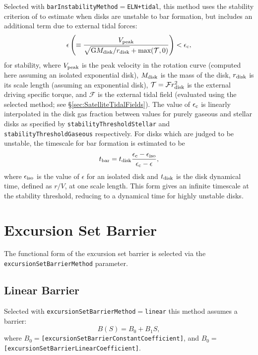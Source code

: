 Selected with {\tt barInstabilityMethod}$=${\tt ELN+tidal}, this method uses the stability criterion of \cite{efstathiou_stability_1982} to estimate when disks are unstable to bar formation, but includes an additional term due to external tidal forces:
\begin{equation}
 \epsilon \left( \equiv {V_{\rm peak} \over \sqrt{\G M_{\rm disk}/r_{\rm disk}} + \hbox{max}(\mathcal{T},0) } \right) < \epsilon_{\rm c},
\end{equation}
for stability, where $V_{\rm peak}$ is the peak velocity in the rotation curve (computed here assuming an isolated exponential disk), $M_{\rm disk}$ is the mass of the disk, $r_{\rm disk}$ is its scale length (assuming an exponential disk), $\mathcal{T} = \mathcal{F} r_{\rm disk}^2$ is the external driving specific torque, and $\mathcal{F}$ is the external tidal field (evaluated using the selected method; see \S\ref{sec:SatelliteTidalFields}). The value of $\epsilon_{\rm c}$ is linearly interpolated in the disk gas fraction between values for purely gaseous and stellar disks as specified by {\tt stabilityThresholdStellar} and {\tt stabilityThresholdGaseous} respectively. For disks which are judged to be unstable, the timescale for bar formation is estimated to be
\begin{equation}
 t_{\rm bar} = t_{\rm disk} {\epsilon_{\rm c} - \epsilon_{\rm iso} \over \epsilon_{\rm c} - \epsilon},
\end{equation}
where $\epsilon_{\rm iso}$ is the value of $\epsilon$ for an isolated disk and $t_{\rm disk}$ is the disk dynamical time, defined as $r/V$, at one scale length. This form gives an infinite timescale at the stability threshold, reducing to a dynamical time for highly unstable disks.

\section{Excursion Set Barrier}

The functional form of the excursion set barrier is selected via the {\tt excursionSetBarrierMethod} parameter.

\subsection{Linear Barrier}

Selected with {\tt excursionSetBarrierMethod}$=${\tt linear} this method assumes a barrier:
\begin{equation}
B(S) = B_0 + B_1 S,
\end{equation}
where $B_0=${\tt [excursionSetBarrierConstantCoefficient]}, and $B_0=${\tt [excursionSetBarrierLinearCoefficient]}.

